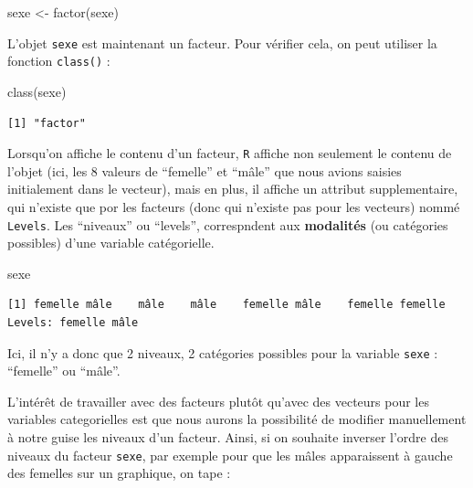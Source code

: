 \documentclass[
  a4paper,
  DIV=11,
  numbers=noendperiod,
  oneside]{scrreprt}
\newenvironment{Shaded}{}{}
\newcommand{\FunctionTok}[1]{\textcolor[rgb]{0.44,0.26,0.76}{#1}}
\newcommand{\NormalTok}[1]{\textcolor[rgb]{0.14,0.16,0.18}{#1}}
\newcommand{\OtherTok}[1]{\textcolor[rgb]{0.44,0.26,0.76}{#1}}
\begin{document}
\begin{Shaded}
\begin{Highlighting}[]
\NormalTok{sexe }\OtherTok{\textless{}{-}} \FunctionTok{factor}\NormalTok{(sexe)}
\end{Highlighting}
\end{Shaded}

L'objet \texttt{sexe} est maintenant un facteur. Pour vérifier cela, on
peut utiliser la fonction \texttt{class()} :

\begin{Shaded}
\begin{Highlighting}[]
\FunctionTok{class}\NormalTok{(sexe)}
\end{Highlighting}
\end{Shaded}

\begin{verbatim}
[1] "factor"
\end{verbatim}

Lorsqu'on affiche le contenu d'un facteur, \texttt{R} affiche non
seulement le contenu de l'objet (ici, les 8 valeurs de ``femelle'' et
``mâle'' que nous avions saisies initialement dans le vecteur), mais en
plus, il affiche un attribut supplementaire, qui n'existe que por les
facteurs (donc qui n'existe pas pour les vecteurs) nommé
\texttt{Levels}. Les ``niveaux'' ou ``levels'', correspndent aux
\textbf{modalités} (ou catégories possibles) d'une variable
catégorielle.

\begin{Shaded}
\begin{Highlighting}[]
\NormalTok{sexe}
\end{Highlighting}
\end{Shaded}

\begin{verbatim}
[1] femelle mâle    mâle    mâle    femelle mâle    femelle femelle
Levels: femelle mâle
\end{verbatim}

Ici, il n'y a donc que 2 niveaux, 2 catégories possibles pour la
variable \texttt{sexe} : ``femelle'' ou ``mâle''.

L'intérêt de travailler avec des facteurs plutôt qu'avec des vecteurs
pour les variables categorielles est que nous aurons la possibilité de
modifier manuellement à notre guise les niveaux d'un facteur. Ainsi, si
on souhaite inverser l'ordre des niveaux du facteur \texttt{sexe}, par
exemple pour que les mâles apparaissent à gauche des femelles sur un
graphique, on tape :
\end{document}
